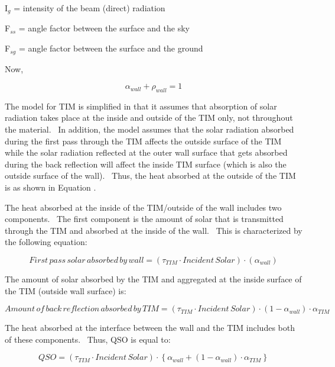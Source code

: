 I\(_{g}\) = intensity of the beam (direct) radiation

F\(_{ss}\) = angle factor between the surface and the sky

F\(_{sg}\) = angle factor between the surface and the ground

Now,

\begin{equation}
{\alpha_{wall}} + {\rho_{wall}} = 1
\end{equation}

The model for TIM is simplified in that it assumes that absorption of solar radiation takes place at the inside and outside of the TIM only, not throughout the material.~ In addition, the model assumes that the solar radiation absorbed during the first pass through the TIM affects the outside surface of the TIM while the solar radiation reflected at the outer wall surface that gets absorbed during the back reflection will affect the inside TIM surface (which is also the outside surface of the wall).~ Thus, the heat absorbed at the outside of the TIM is as shown in Equation .

The heat absorbed at the inside of the TIM/outside of the wall includes two components.~ The first component is the amount of solar that is transmitted through the TIM and absorbed at the inside of the wall.~ This is characterized by the following equation:

\begin{equation}
First\,pass\,solar\,absorbed\,by\,wall = \left( {{\tau_{TIM}}\cdot Incident\,Solar} \right)\cdot \left( {{\alpha_{wall}}} \right)
\end{equation}

The amount of solar absorbed by the TIM and aggregated at the inside surface of the TIM (outside wall surface) is:

\begin{equation}
Amount\,of\,back\,reflection\,absorbed\,by\,TIM = \left( {{\tau_{TIM}}\cdot Incident\,Solar} \right)\cdot \left( {1 - {\alpha_{wall}}} \right)\cdot {\alpha_{TIM}}
\end{equation}

The heat absorbed at the interface between the wall and the TIM includes both of these components.~ Thus, QSO is equal to:

\begin{equation}
QSO = \left( {{\tau_{TIM}}\cdot Incident\,Solar} \right)\cdot \left\{ {{\alpha_{wall}} + \left( {1 - {\alpha_{wall}}} \right)\cdot \alpha {}_{TIM}} \right\}
\end{equation}

